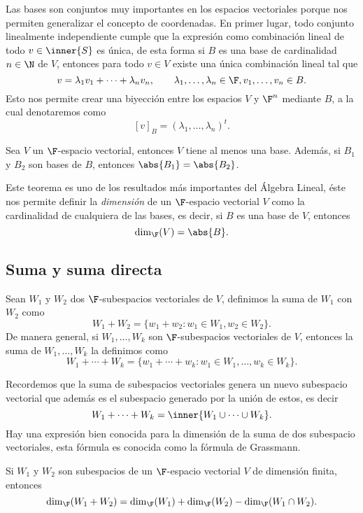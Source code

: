 Las bases son conjuntos muy importantes en los espacios vectoriales porque nos permiten generalizar el concepto de coordenadas. En primer lugar, todo conjunto linealmente independiente cumple que la expresión como combinación lineal de todo $v \in \inner{S}$ es única, de esta forma si $B$ es una base de cardinalidad $n \in \N$ de $V$, entonces para todo $v \in V$ existe una única combinación lineal tal que 
\[ v = \lambda_1 v_1 + \cdots + \lambda_n v_n, \qquad \lambda_1,\ldots,\lambda_n \in \F, v_1,\ldots,v_n \in B. \]
Esto nos permite crear una biyección entre los espacios $V$ y $\F^n$ mediante $B$, a la cual denotaremos como
\[ [v]_B = (\lambda_1, \ldots, \lambda_n)^t.\]

\begin{teor}
  Sea $V$ un $\F$-espacio vectorial, entonces $V$ tiene al menos una base. Además, si $B_1$ y $B_2$ son bases de $B$, entonces $\abs{B_1} = \abs{B_2}$.
\end{teor}

Este teorema es uno de los resultados más importantes del Álgebra Lineal, éste nos permite definir la \emph{dimensión} de un $\F$-espacio vectorial $V$ como la cardinalidad de cualquiera de las bases, es decir, si $B$ es una base de $V$, entonces
\[ \dim_\F (V) = \abs{B}. \]


\subsection{Suma y suma directa}

\begin{defi}
  Sean $W_1$ y $W_2$ dos $\F$-subespacios vectoriales de $V$, definimos la suma de $W_1$ con $W_2$ como
  \[ W_1 + W_2 = \{ w_1 + w_2 : w_1 \in W_1, w_2 \in W_2 \}.\]
  De manera general, si $W_1, \ldots, W_k$ son $\F$-subespacios vectoriales de $V$, entonces la suma de $W_1, \ldots, W_k$  la definimos como
  \[ W_1 + \cdots + W_k = \{ w_1 + \cdots + w_k : w_1 \in W_1, \ldots ,w_k \in W_k \}.\]
\end{defi}

Recordemos que la suma de subespacios vectoriales genera un nuevo subespacio vectorial que además es el subespacio generado por la unión de estos, es decir
  \[ W_1 + \cdots + W_k = \inner{ W_1 \cup \cdots \cup W_k }. \]
Hay una expresión bien conocida para la dimensión de la suma de dos subespacio vectoriales, esta fórmula es conocida como la fórmula de Grassmann.

\begin{teor}
  Si $W_1$ y $W_2$ son subespacios de un $\F$-espacio vectorial $V$ de dimensión finita, entonces
    \[ \dim_\F (W_1 + W_2) = \dim_\F (W_1) + \dim_\F (W_2) - \dim_\F (W_1 \cap W_2).\]
\end{teor}


